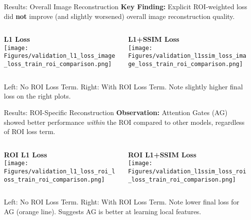 \documentclass{beamer}
\begin{document}
\begin{frame}{Results: Overall Image Reconstruction}
  \textbf{Key Finding:} Explicit ROI-weighted loss did \textbf{not} improve (and slightly worsened) overall image reconstruction quality.
  \vfill
  \begin{columns}[T]
      \begin{column}{0.5\textwidth}
          \centering \textbf{L1 Loss} \\
          \texttt{[image: Figures/validation\_l1\_loss\_image\_loss\_train\_roi\_comparison.png]}
      \end{column}
      \begin{column}{0.5\textwidth}
          \centering \textbf{L1+SSIM Loss} \\
          \texttt{[image: Figures/validation\_l1ssim\_loss\_image\_loss\_train\_roi\_comparison.png]}
      \end{column}
  \end{columns}
  \tiny Left: No ROI Loss Term. Right: With ROI Loss Term. Note slightly higher final loss on the right plots.
\end{frame}

\begin{frame}{Results: ROI-Specific Reconstruction}
  \textbf{Observation:} Attention Gates (AG) showed better performance \textit{within} the ROI compared to other models, regardless of ROI loss term.
  \vfill
  \begin{columns}[T]
      \begin{column}{0.5\textwidth}
          \centering \textbf{ROI L1 Loss} \\
          \texttt{[image: Figures/validation\_l1\_loss\_roi\_loss\_train\_roi\_comparison.png]}
      \end{column}
      \begin{column}{0.5\textwidth}
          \centering \textbf{ROI L1+SSIM Loss} \\
          \texttt{[image: Figures/validation\_l1ssim\_loss\_roi\_loss\_train\_roi\_comparison.png]}
      \end{column}
  \end{columns}
  \tiny Left: No ROI Loss Term. Right: With ROI Loss Term. Note lower final loss for AG (orange line). Suggests AG is better at learning local features.
\end{frame}
\end{document}
